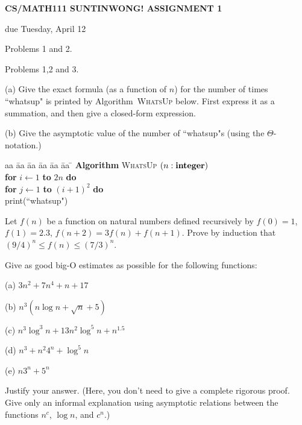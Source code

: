 \documentclass{article}
\begin{document}
\centerline{\large \bf CS/MATH111 SUNTINWONG! ASSIGNMENT 1}
\centerline{due Tuesday, April 12}

\vskip 0.1in
 Problems 1 and 2.

 Problems 1,2 and 3.

\vskip 0.2in


\begin{problem}
(a)
Give the exact formula (as a function of $n$) for the number of
times ``whatsup" is printed by Algorithm~\textsc{WhatsUp} below.
First express it as a summation, and then give a closed-form expression.

\noindent
(b)
Give the asymptotic value of the
number of ``whatsup"s (using the $\Theta$-notation.)

\begin{tabbing}
aa \= aa \= aa \= aa \= aa \= aa \= \kill
\textbf{Algorithm} \textsc{WhatsUp} $(n: \mbox{\bf integer})$ \\
      \> \textbf{for} $i \leftarrow 1$ \textbf{to} $2n$
                         \textbf{do} \\
      \> \> \textbf{for} $j \leftarrow 1$ \textbf{to} $(i+1)^2$ \textbf{do} \\
      \> \> \> print(``whatsup")
\end{tabbing}
\end{problem}


\begin{problem}
Let $f(n)$ be a function on natural numbers defined
recursively by $f(0) = 1$, $f(1) = 2.3$, $f(n+2) = 3f(n) + f(n+1)$.
Prove by induction that
$(9/4)^n \le f(n) \le (7/3)^n$.
\end{problem}


\begin{problem}
Give as good big-O estimates as possible for the
following functions:
%
\begin{description}
%
\item{(a)} $3n^2 + 7 n^4 + n + 17$
\item{(b)} $n^3 (n\log n + \sqrt{n}+5 )$
\item{(c)} $n^3\log^3n + 13 n^2\log^5n + n^{1.5}$
\item{(d)} $n^3 + n^2 4^n + \log^5 n$
\item{(e)} $n3^n + 5^n$
%
\end{description}
%
Justify your answer.
(Here, you don't need to give a complete rigorous proof.
Give only an informal explanation using asymptotic
relations between the functions $n^c$, $\log n$, and
$c^n$.)
\end{problem}
\end{document}
